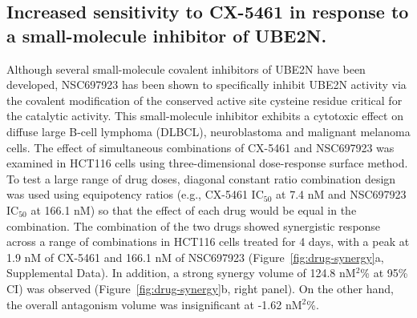 \subsection{Increased sensitivity to CX-5461 in response to a small-molecule inhibitor of UBE2N.}
Although several small-molecule covalent inhibitors of UBE2N have been developed\cite{Tsukamoto2008,Ushiyama2012,Strickson2013}, NSC697923 has been shown to specifically inhibit UBE2N activity via the covalent modification of the conserved active site cysteine residue critical for the catalytic activity\cite{Hodge2015a}. 
This small-molecule inhibitor exhibits a cytotoxic effect on diffuse large B-cell lymphoma (DLBCL), neuroblastoma and malignant melanoma cells\cite{Pulvino2012,Cheng2014,Dikshit2018a}. 
The effect of simultaneous combinations of CX-5461 and NSC697923 was examined in HCT116 cells using three-dimensional dose-response surface method\cite{Prichard1990,Prichard1993}. 
To test a large range of drug doses, diagonal constant ratio combination design was used using equipotency ratios (e.g., CX-5461 IC$_{50}$ at 7.4 nM and NSC697923 IC$_{50}$ at 166.1 nM) so that the effect of each drug would be equal in the combination\cite{Chou2006}. 
The combination of the two drugs showed synergistic response across a range of combinations in HCT116 cells treated for 4 days, with a peak at 1.9 nM of CX-5461 and 166.1 nM of NSC697923 (Figure~\ref{fig:drug-synergy}a, Supplemental Data). 
In addition, a strong synergy volume of 124.8 nM$^2$\% at 95\% CI) was observed (Figure~\ref{fig:drug-synergy}b, right panel). 
On the other hand, the overall antagonism volume was insignificant at -1.62 nM$^2$\%.